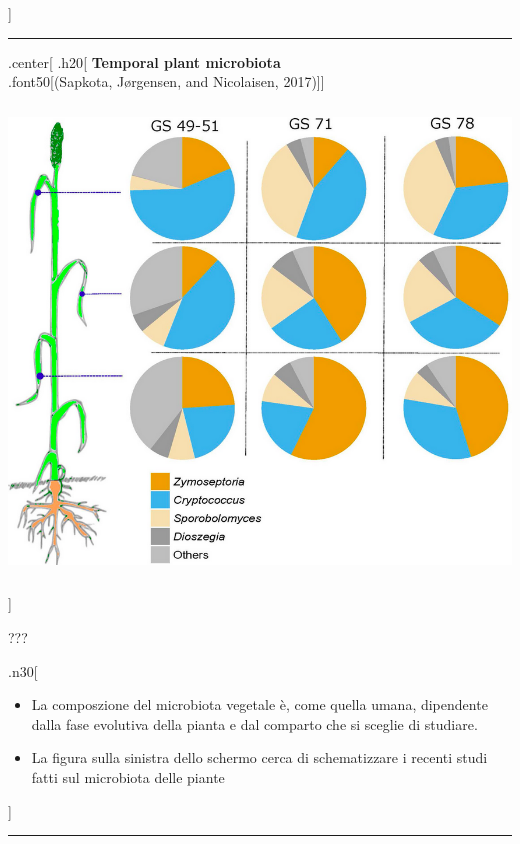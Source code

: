 \documentclass[
]{article}
\begin{document}
{]}

\begin{center}\rule{0.5\linewidth}{0.5pt}\end{center}

.center{[} .h20{[} \textbf{Temporal plant microbiota}\\
.font50{[}(Sapkota, Jørgensen, and Nicolaisen, 2017){]}{]}

\begin{center}\includegraphics[width=530px,height=470px]{images/plantMicrobiotaTemporal} \end{center}

{]}

???

.n30{[}

\begin{itemize}
\item
  La composzione del microbiota vegetale è, come quella umana,
  dipendente dalla fase evolutiva della pianta e dal comparto che si
  sceglie di studiare.
\item
  La figura sulla sinistra dello schermo cerca di schematizzare i
  recenti studi fatti sul microbiota delle piante
\end{itemize}

{]}

\begin{center}\rule{0.5\linewidth}{0.5pt}\end{center}
\end{document}
